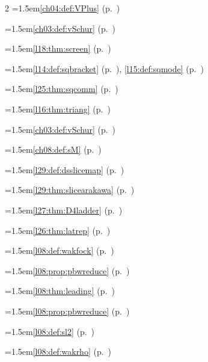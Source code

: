 \begin{multicols}{2}
\hangindent=1.5em\quad \ref{ch04:def:VPlus} (p.~\pageref{ch04:def:VPlus})\par
\hangindent=1.5em\quad \ref{ch03:def:vSchur} (p.~\pageref{ch03:def:vSchur})\par
\hangindent=1.5em\quad \ref{l18:thm:screen} (p.~\pageref{l18:thm:screen})\par
\hangindent=1.5em\quad \ref{l14:def:sqbracket} (p.~\pageref{l14:def:sqbracket}), \ref{l15:def:sqmode} (p.~\pageref{l15:def:sqmode})\par
\hangindent=1.5em\quad \ref{l25:thm:sqcomm} (p.~\pageref{l25:thm:sqcomm})\par
\hangindent=1.5em\quad \ref{l16:thm:triang} (p.~\pageref{l16:thm:triang})\par
\hangindent=1.5em\quad \ref{ch03:def:vSchur} (p.~\pageref{ch03:def:vSchur})\par
\hangindent=1.5em\quad \ref{ch08:def:sM} (p.~\pageref{ch08:def:sM})\par
\par{}\par\nopagebreak\smallskip
\hangindent=1.5em\quad \ref{l29:def:dsslicemap} (p.~\pageref{l29:def:dsslicemap})\par
\hangindent=1.5em\quad \ref{l29:thm:slicearakawa} (p.~\pageref{l29:thm:slicearakawa})\par
\hangindent=1.5em\quad \ref{l27:thm:D4ladder} (p.~\pageref{l27:thm:D4ladder})\par
\hangindent=1.5em\quad \ref{l26:thm:latrep} (p.~\pageref{l26:thm:latrep})\par
\hangindent=1.5em\quad \ref{l08:def:wakfock} (p.~\pageref{l08:def:wakfock})\par
\hangindent=1.5em\quad \ref{l08:prop:pbwreduce} (p.~\pageref{l08:prop:pbwreduce})\par
\hangindent=1.5em\quad \ref{l08:thm:leading} (p.~\pageref{l08:thm:leading})\par
\hangindent=1.5em\quad \ref{l08:prop:pbwreduce} (p.~\pageref{l08:prop:pbwreduce})\par
\hangindent=1.5em\quad \ref{l08:def:sl2} (p.~\pageref{l08:def:sl2})\par
\hangindent=1.5em\quad \ref{l08:def:wakrho} (p.~\pageref{l08:def:wakrho})\par

\end{multicols}
